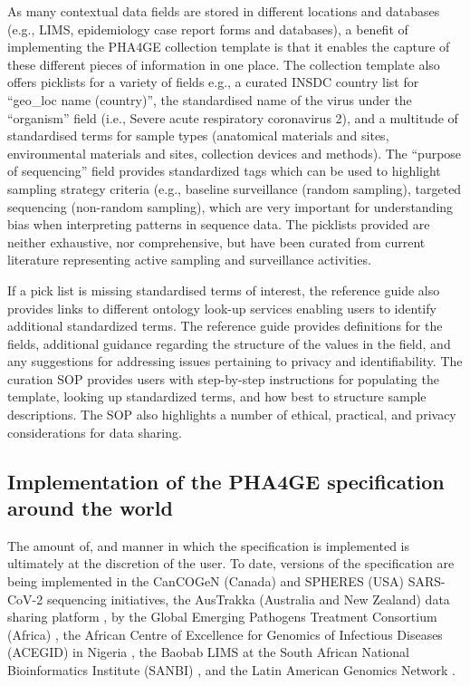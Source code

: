 \normalsize	

As many contextual data fields are stored in different locations and databases (e.g., LIMS, epidemiology case report forms and databases), a benefit of implementing the PHA4GE collection template is that it enables the capture of these different pieces of information in one place. The collection template also offers picklists for a variety of fields e.g., a curated INSDC country list for “geo\_loc name (country)”, the standardised name of the virus under the “organism” field (i.e., Severe acute respiratory coronavirus 2), and a multitude of standardised terms for sample types (anatomical materials and sites, environmental materials and sites, collection devices and methods). The “purpose of sequencing” field provides standardized tags which can be used to highlight sampling strategy criteria (e.g., baseline surveillance (random sampling), targeted sequencing (non-random sampling), which are very important for understanding bias when interpreting patterns in sequence data. The picklists provided are neither exhaustive, nor comprehensive, but have been curated from current literature representing active sampling and surveillance activities.

If a pick list is missing standardised terms of interest, the reference guide also provides links to different ontology look-up services enabling users to identify additional standardized terms. The reference guide provides definitions for the fields, additional guidance regarding the structure of the values in the field, and any suggestions for addressing issues pertaining to privacy and identifiability. The curation SOP provides users with step-by-step instructions for populating the template, looking up standardized terms, and how best to structure sample descriptions. The SOP also highlights a number of ethical, practical, and privacy considerations for data sharing.


\subsection{Implementation of the PHA4GE specification around the world}

The amount of, and manner in which the specification is implemented is ultimately at the discretion of the user. To date, versions of the specification are being implemented in the CanCOGeN (Canada) and SPHERES (USA) SARS-CoV-2 sequencing initiatives, the AusTrakka (Australia and New Zealand) data sharing platform \cite{world_health_organization_coronavirus_nodate, dong_interactive_2020, covid-19_genomics_uk_cog-uk_consortiumcontactcogconsortiumuk_integrated_2020}, by the Global Emerging Pathogens Treatment Consortium (Africa) \cite{noauthor_get_nodate}, the African Centre of Excellence for Genomics of Infectious Diseases (ACEGID) in Nigeria \cite{noauthor_acegid_nodate}, the Baobab LIMS \cite{noauthor_welcome_nodate} at the South African National Bioinformatics Institute (SANBI) \cite{noauthor_sanbi_nodate}, and the Latin American Genomics Network \cite{noauthor_covid-19_nodate}. 

